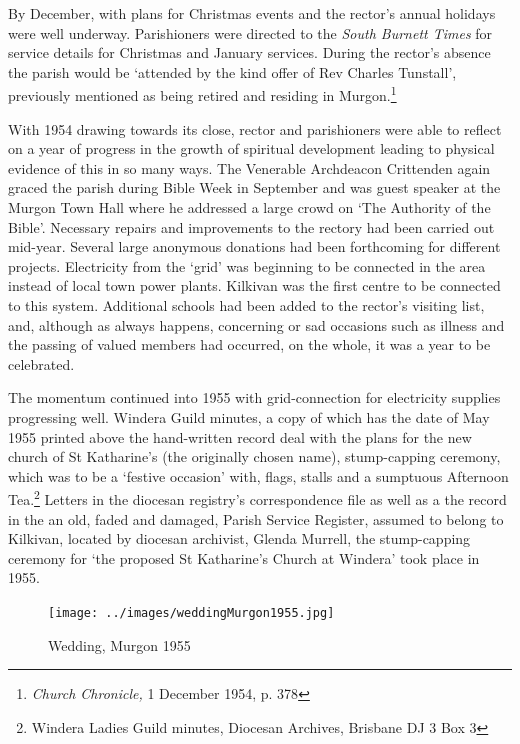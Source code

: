 By December, with plans for Christmas events and the rector's annual holidays were well underway. Parishioners were directed to the \emph{South Burnett Times} for service details for Christmas and January services. During the rector's absence the parish would be `attended by the kind offer of Rev Charles Tunstall', previously mentioned as being retired and residing in Murgon.\footnote{\emph{Church Chronicle,} 1 December 1954, p. 378}


With 1954 drawing towards its close, rector and parishioners were able to reflect on a year of progress in the growth of spiritual development leading to physical evidence of this in so many ways. The Venerable Archdeacon Crittenden again graced the parish during Bible Week in September and was guest speaker at the Murgon Town Hall where he addressed a large crowd on `The Authority of the Bible'. Necessary repairs and improvements to the rectory had been carried out mid-year. Several large anonymous donations had been forthcoming for different projects. Electricity from the `grid' was beginning to be connected in the area instead of local town power plants. Kilkivan was the first centre to be connected to this system. Additional schools had been added to the rector's visiting list, and, although as always happens, concerning or sad occasions such as illness and the passing of valued members had occurred, on the whole, it was a year to be celebrated.



The momentum continued into 1955 with grid-connection for electricity supplies progressing well. Windera Guild minutes, a copy of which has the date of May 1955 printed above the hand-written record deal with the plans for the new church of St Katharine's (the originally chosen name), stump-capping ceremony, which was to be a `festive occasion' with, flags, stalls and a sumptuous Afternoon Tea.\footnote{Windera Ladies Guild minutes, Diocesan Archives, Brisbane DJ 3 Box 3} Letters in the diocesan registry's correspondence file as well as a the record in the an old, faded and damaged, Parish Service Register, assumed to belong to Kilkivan, located by diocesan archivist, Glenda Murrell, the stump-capping ceremony for `the proposed St Katharine's Church at Windera' took place in 1955.








\begin{figure}
\begin{center}
\texttt{[image: ../images/weddingMurgon1955.jpg]}
\caption{Wedding, Murgon 1955}
\end{center}
\end{figure}










